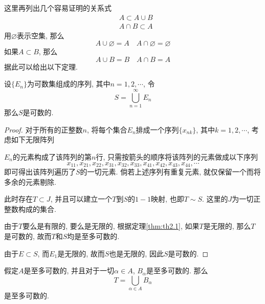 \documentclass[cn,12pt,math=mtpro2,citestyle=gb7714-2015,bibstyle=gb7714-2015,twocol]{elegantbook}
\let\emptyset\varnothing
\begin{document}
这里再列出几个容易证明的关系式
\begin{align*}
&A\subset A\cup B \\
&A\cap B\subset A
\end{align*}
用$\emptyset$表示空集, 那么
$$A\cup\emptyset=A\quad A\cap\emptyset=\emptyset$$
如果$A\subset B$, 那么
$$A\cup B=B\quad A\cap B=A$$
据此可以给出以下定理.
\begin{theorem}\label{thm:th2.2}
  设$\{E_n\}$为可数集组成的序列, 其中$n=1,2,\cdots$, 令
  $$S=\bigcup_{n=1}^\infty E_n$$
  那么$S$是可数的.
\end{theorem}
\begin{proof}
对于所有的正整数$n$, 将每个集合$E_n$排成一个序列$\{x_{nk}\}$, 其中$k=1, 2, \cdots $, 考虑如下无限阵列
\begin{center}
\end{center}
$E_n$的元素构成了该阵列的第$n$行, 只需按箭头的顺序将该阵列的元素做成以下序列
$$x_{11}, x_{21}, x_{22},  x_{31}, x_{32}, x_{33},x_{41}, x_{42}, x_{43}, x_{44}, \cdots$$
即可得出该阵列遍历了$S$的一切元素. 倘若上述序列有重复元素, 就仅保留一个而将多余的元素剔除.

此时存在$T\subset J$, 并且可以建立一个$T$到$S$的$1-1$映射, 也即$T\sim S$. 这里的$J$为一切正整数构成的集合.

由于$T$要么是有限的, 要么是无限的, 根据定理\ref{thm:th2.1},  如果$T$是无限的, 那么$T$是可数的, 故而$T$和$S$均是至多可数的.

由于$E\subset S$, 而$E_1$是无限的, 故而$S$也是无限的, 因此$S$是可数的.


\end{proof}
\begin{corollary}
假定$A$是至多可数的, 并且对于一切$\alpha\in A$, $B_\alpha$是至多可数的. 那么
$$T=\bigcup_{\alpha\in A}B_\alpha$$
是至多可数的.
\end{corollary}
\end{document}
